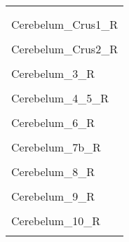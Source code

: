\documentclass[
]{article}
\begin{document}
\begin{table}[htbp]

\caption{\label{tab:unnamed-chunk-4}}
\centering
\begin{tabular}[t]{l}
\toprule
\\
\midrule
\addlinespace[0.3em]
\multicolumn{1}{l}{\textbf{Cerebellum}}\\
\hspace{1em}\cellcolor{gray!6}{Cerebelum\_Crus1\_L}\\
\hspace{1em}Cerebelum\_Crus1\_R\\
\hspace{1em}\cellcolor{gray!6}{Cerebelum\_Crus2\_L}\\
\hspace{1em}Cerebelum\_Crus2\_R\\
\hspace{1em}\cellcolor{gray!6}{Cerebelum\_3\_L}\\
\hspace{1em}Cerebelum\_3\_R\\
\hspace{1em}\cellcolor{gray!6}{Cerebelum\_4\_5\_L}\\
\hspace{1em}Cerebelum\_4\_5\_R\\
\hspace{1em}\cellcolor{gray!6}{Cerebelum\_6\_L}\\
\hspace{1em}Cerebelum\_6\_R\\
\hspace{1em}\cellcolor{gray!6}{Cerebelum\_7b\_L}\\
\hspace{1em}Cerebelum\_7b\_R\\
\hspace{1em}\cellcolor{gray!6}{Cerebelum\_8\_L}\\
\hspace{1em}Cerebelum\_8\_R\\
\hspace{1em}\cellcolor{gray!6}{Cerebelum\_9\_L}\\
\hspace{1em}Cerebelum\_9\_R\\
\hspace{1em}\cellcolor{gray!6}{Cerebelum\_10\_L}\\
\hspace{1em}Cerebelum\_10\_R\\
\hspace{1em}\cellcolor{gray!6}{Vermis\_1\_2}\\

\end{tabular}
\end{table}
\end{document}
